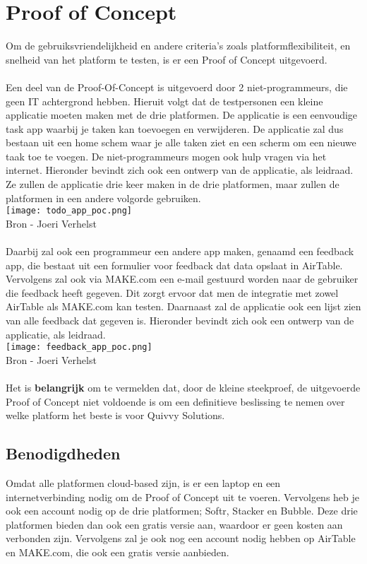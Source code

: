 \section*{Proof of Concept}
\label{sec:proof-of-concept}
Om de gebruiksvriendelijkheid en andere criteria's zoals platformflexibiliteit, en snelheid van het platform te testen, is er een Proof of Concept uitgevoerd. 
\\
\\
Een deel van de Proof-Of-Concept is uitgevoerd door 2 niet-programmeurs, die geen IT achtergrond hebben. Hieruit volgt dat de testpersonen
een kleine applicatie moeten maken met de drie platformen. De applicatie is een eenvoudige task app waarbij je taken kan toevoegen en verwijderen.
De applicatie zal dus bestaan uit een home schem waar je alle taken ziet en een scherm om een nieuwe taak toe te voegen. De niet-programmeurs mogen ook hulp vragen via het internet.
Hieronder bevindt zich ook een ontwerp van de applicatie, als leidraad. Ze zullen de applicatie drie keer maken in de drie platformen, maar zullen de platformen in een andere volgorde gebruiken.
\\
\texttt{[image: todo\_app\_poc.png]}
\\
Bron - Joeri Verhelst 
\\
\\
Daarbij zal ook een programmeur een andere app maken, genaamd een feedback app, die bestaat uit een formulier voor feedback dat data opslaat in AirTable.
Vervolgens zal ook via MAKE.com een e-mail gestuurd worden naar de gebruiker die feedback heeft gegeven.
Dit zorgt ervoor dat men de integratie met zowel AirTable als MAKE.com kan testen. Daarnaast zal de applicatie ook een lijst zien van alle feedback dat gegeven is.
Hieronder bevindt zich ook een ontwerp van de applicatie, als leidraad.
\\
\texttt{[image: feedback\_app\_poc.png]}
\\
Bron - Joeri Verhelst 
\\
\\
Het is \textbf{belangrijk} om te vermelden dat, door de kleine steekproef, de uitgevoerde Proof of Concept niet voldoende is om een 
definitieve beslissing te nemen over welke platform het beste is voor Quivvy Solutions.

\subsection*{Benodigdheden}
Omdat alle platformen cloud-based zijn, is er een laptop en een internetverbinding nodig om de Proof of Concept uit te voeren. Vervolgens heb je ook 
een account nodig op de drie platformen; Softr, Stacker en Bubble. Deze drie platformen bieden dan ook een gratis versie aan, waardoor er geen kosten aan verbonden zijn. Vervolgens zal je ook 
nog een account nodig hebben op AirTable en MAKE.com, die ook een gratis versie aanbieden.


